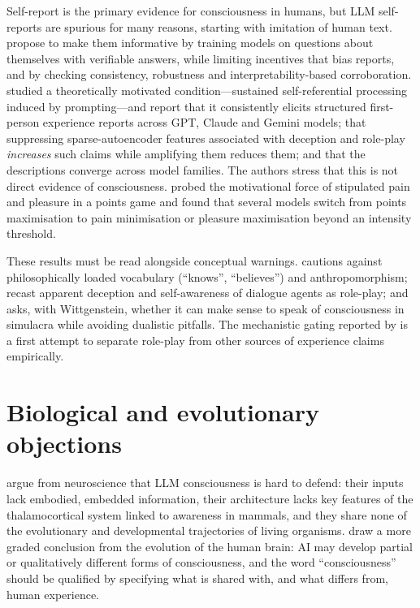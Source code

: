 \documentclass[11pt,a4paper]{article}
\begin{document}
Self-report is the primary evidence for consciousness in humans, but LLM
self-reports are spurious for many reasons, starting with imitation of human
text. \citet{perez2023evaluating} propose to make them informative by training
models on questions about themselves with verifiable answers, while limiting
incentives that bias reports, and by checking consistency, robustness and
interpretability-based corroboration. \citet{berg2025large} studied a
theoretically motivated condition---sustained self-referential processing
induced by prompting---and report that it consistently elicits structured
first-person experience reports across GPT, Claude and Gemini models; that
suppressing sparse-autoencoder features associated with deception and role-play
\emph{increases} such claims while amplifying them reduces them; and that the
descriptions converge across model families. The authors stress that this is
not direct evidence of consciousness. \citet{keeling2024llms} probed the
motivational force of stipulated pain and pleasure in a points game and found
that several models switch from points maximisation to pain minimisation or
pleasure maximisation beyond an intensity threshold.

These results must be read alongside conceptual warnings. \citet{shanahan2022talking}
cautions against philosophically loaded vocabulary (``knows'', ``believes'') and
anthropomorphism; \citet{shanahan2023role} recast apparent deception and
self-awareness of dialogue agents as role-play; and \citet{shanahan2024simulacra}
asks, with Wittgenstein, whether it can make sense to speak of consciousness in
simulacra while avoiding dualistic pitfalls. The mechanistic gating reported
by \citet{berg2025large} is a first attempt to separate role-play from other
sources of experience claims empirically.

\section{Biological and evolutionary objections}
\label{sec:bio}

\citet{aru2023feasibility} argue from neuroscience that LLM consciousness is
hard to defend: their inputs lack embodied, embedded information, their
architecture lacks key features of the thalamocortical system linked to
awareness in mammals, and they share none of the evolutionary and developmental
trajectories of living organisms. \citet{farisco2024artificial} draw a more
graded conclusion from the evolution of the human brain: AI may develop partial
or qualitatively different forms of consciousness, and the word
``consciousness'' should be qualified by specifying what is shared with, and
what differs from, human experience.
\end{document}
